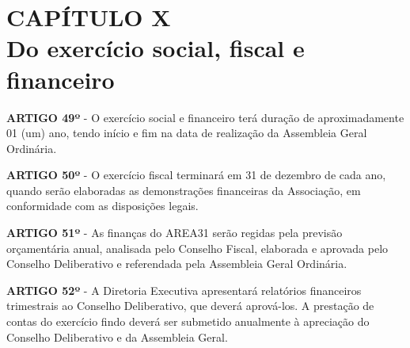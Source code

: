 \chapter*{CAPÍTULO X\\ Do exercício social, fiscal e financeiro}

\textbf{ARTIGO 49º} - O exercício social e financeiro terá duração de 
aproximadamente 01 (um) ano, tendo início e fim na data de 
realização da Assembleia Geral Ordinária.

\bigskip

\textbf{ARTIGO 50º} - O exercício fiscal terminará em 31 de dezembro de 
cada ano, quando serão elaboradas as demonstrações financeiras da 
Associação, em conformidade com as disposições legais.

\bigskip

\textbf{ARTIGO 51º} - As finanças do AREA31 serão regidas pela previsão 
orçamentária anual, analisada pelo Conselho Fiscal, elaborada e 
aprovada pelo Conselho Deliberativo e referendada 
pela Assembleia Geral Ordinária.

\bigskip

\textbf{ARTIGO 52º} - A Diretoria Executiva apresentará relatórios 
financeiros trimestrais ao Conselho Deliberativo, que deverá aprová-los. 
A prestação de contas do exercício findo deverá ser submetido anualmente 
à apreciação do Conselho Deliberativo e da Assembleia Geral.
